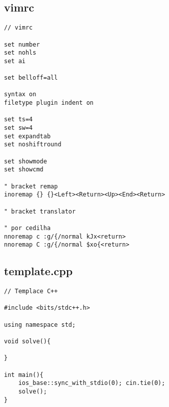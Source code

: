 \documentclass[11pt, a4paper, twoside]{article}
\begin{document}
\subsection{vimrc}
\begin{lstlisting}
// vimrc

set number
set nohls
set ai

set belloff=all

syntax on
filetype plugin indent on

set ts=4
set sw=4
set expandtab
set noshiftround

set showmode
set showcmd

" bracket remap
inoremap {} {}<Left><Return><Up><End><Return> 

" bracket translator

" por cedilha
nnoremap c :g/{/normal kJx<return>
nnoremap C :g/{/normal $xo{<return>
\end{lstlisting}

\subsection{template.cpp}
\begin{lstlisting}
// Templace C++

#include <bits/stdc++.h>

using namespace std;

void solve(){

}

int main(){
	ios_base::sync_with_stdio(0); cin.tie(0);
	solve();
}
\end{lstlisting}
\end{document}
